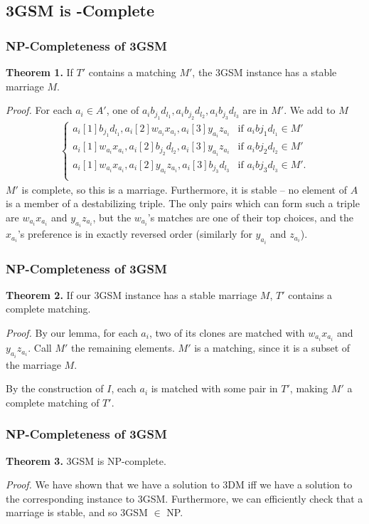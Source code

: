 \documentclass[mathserif,serif]{beamer}
\begin{document}


\subsection{3GSM is \NP-Complete}

\begin{frame}
  \frametitle{NP-Completeness of 3GSM}
  \textbf{Theorem 1.} If $T'$ contains a matching $M'$, the 3GSM instance has a stable marriage $M$.

  \textit{Proof.} For each $a_i \in A'$, one of $a_ib_{j_1}d_{l_1}, a_ib_{j_2}d_{l_2}, a_ib_{j_3}d_{l_3}$ are in $M'$. We add to $M$
  \begin{align*}
    \begin{cases}
      a_i[1]b_{j_1}d_{l_1}, a_i[2]w_{a_i}x_{a_i}, a_i[3]y_{a_i}z_{a_i} & \text{if } a_ib{j_1}d_{l_1} \in M' \\
      a_i[1]w_{a_i}x_{a_i}, a_i[2]b_{j_2}d_{l_2}, a_i[3]y_{a_i}z_{a_i} & \text{if } a_ib{j_2}d_{l_2} \in M' \\
      a_i[1]w_{a_i}x_{a_i}, a_i[2]y_{a_i}z_{a_i}, a_i[3]b_{j_3}d_{l_3} & \text{if } a_ib{j_3}d_{l_3} \in M'. \\
    \end{cases}
  \end{align*}
  $M'$ is complete, so this is a marriage. Furthermore, it is stable -- no element of $A$ is a member of a destabilizing triple. The only pairs which can form such a triple are $w_{a_i}x_{a_i}$ and $y_{a_i}z_{a_i}$, but the $w_{a_i}$'s matches are one of their top choices, and the $x_{a_i}$'s preference is in exactly reversed order (similarly for $y_{a_i}$ and $z_{a_i}$).
\end{frame}

\begin{frame}
  \frametitle{NP-Completeness of 3GSM}
  \textbf{Theorem 2.} If our 3GSM instance has a stable marriage $M$, $T'$ contains a complete matching.

  \textit{Proof.} By our lemma, for each $a_i$, two of its clones are matched with $w_{a_i}x_{a_i}$ and $y_{a_i}z_{a_i}$. Call $M'$ the remaining elements. $M'$ is a matching, since it is a subset of the marriage $M$.

  By the construction of $I$, each $a_i$ is matched with some pair in $T'$, making $M'$ a complete matching of $T'$.
\end{frame}

\begin{frame}
  \frametitle{NP-Completeness of 3GSM}
  \textbf{Theorem 3.} 3GSM is NP-complete.

  \textit{Proof.} We have shown that we have a solution to 3DM iff we have a solution to the corresponding instance to 3GSM. Furthermore, we can efficiently check that a marriage is stable, and so 3GSM $\in$ NP.
\end{frame}
\end{document}
